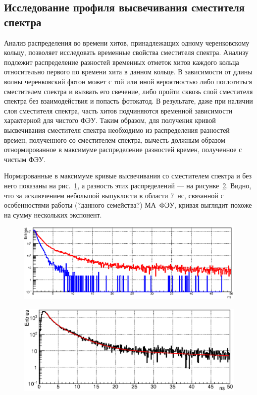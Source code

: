 \subsection{Исследование профиля высвечивания сместителя спектра}\label{section:secWLS}

Анализ распределения во времени хитов, принадлежащих одному черенковскому кольцу, позволяет исследовать временные свойства сместителя спектра. Анализу подлежит распределение разностей временных отметок хитов каждого кольца относительно первого по времени хита в данном кольце. В зависимости от длины волны черенковский фотон может с той или иной вероятностью либо поглотиться сместителем спектра и вызвать его свечение, либо пройти сквозь слой сместителя спектра без взаимодействия и попасть фотокатод. В результате, даже при наличии слоя сместителя спектра, часть хитов подчиняются временной зависимости характерной для чистого ФЭУ.
Таким образом, для получения кривой высвечивания сместителя спектра необходимо из распределения разностей времен, полученного со сместителем спектра, вычесть должным образом отнормированное в максимуме распределение разностей времен, полученное с чистым ФЭУ.

Нормированные в максимуме кривые высвечивания со сместителем спектра и без него показаны на рис.~\ref{fig:WLStwoCurves}, а разность этих распределений --- на рисунке~\ref{fig:WLSdiff}. Видно, что за исключением небольшой выпуклости в области 7~нс, связанной с особенностями работы (?данного семейства?) МА~ФЭУ, кривая выглядит похоже на сумму нескольких экспонент.

\begin{figure}
\includegraphics[width=1.0\textwidth]{pictures/WLS.eps}
\caption{}
\label{fig:WLStwoCurves}
\end{figure}

\begin{figure}
\includegraphics[width=1.0\textwidth]{pictures/WLSdiff_1Nov.eps}
\caption{}
\label{fig:WLSdiff}
\end{figure}

